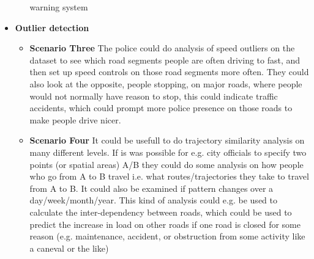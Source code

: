 \begin{itemize}
\begin{itemize}
warning system
	\end{itemize}
	\item {\bf Outlier detection}
	\begin{itemize}
		\item {\bf Scenario Three} The police could do analysis of speed outliers on the dataset to see which road segments people are often driving to fast, 
and then set up speed controls on those road segments more often. They could also look at the opposite, people stopping, on major roads, 
where people would not normally have reason to stop, this could indicate traffic accidents, which could prompt more police presence on those roads
to make people drive nicer.
		\item {\bf Scenario Four} It could be usefull to do trajectory similarity analysis on many different levels. If is was possible
for e.g. city officials to specify two points (or spatial areas) A/B they could do some analysis on how people who go from A to B travel i.e.
what routes/trajectories they take to travel from A to B. It could also be examined if pattern changes over a day/week/month/year.
This kind of analysis could e.g. be used to calculate the inter-dependency between roads, which could be used to predict the increase in
load on other roads if one road is closed for some reason (e.g. maintenance, accident, or obstruction from some activity like a caneval or the like)
	\end{itemize}
	
\end{itemize}
